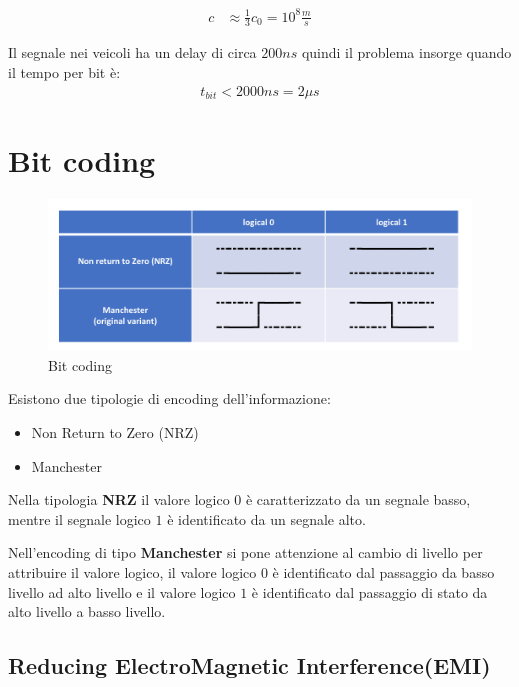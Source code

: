 \begin{align}
  c &\approx \frac{1}{3} c_0 = 10^8 \frac{m}{s}
  \label{eq:velocita_segale_bus}
\end{align}

Il segnale nei veicoli ha un delay di circa $200ns$ quindi il problema insorge quando il tempo per bit è:
\begin{align}
  t_{bit} < 2000ns = 2 \mu s
\end{align}


\section{Bit coding}
\begin{figure}[!ht]
  \begin{adjustbox}{width=0.5\columnwidth, center}
    \includegraphics{images/bit_coding.png}
  \end{adjustbox}
  \caption{Bit coding}
  \label{fig:bit_coding}
\end{figure}

Esistono due tipologie di encoding dell'informazione:
\begin{itemize}
  \item Non Return to Zero (NRZ)
  \item Manchester
\end{itemize}

Nella tipologia \textbf{NRZ} il valore logico $0$ è caratterizzato da un segnale basso, mentre il segnale logico $1$ è identificato da un segnale alto.

Nell'encoding di tipo \textbf{Manchester} si pone attenzione al cambio di livello per attribuire il valore logico, il valore logico $0$ è identificato dal passaggio da basso livello ad alto livello e il valore logico $1$ è identificato dal passaggio di stato da alto livello a basso livello.



\subsection{Reducing ElectroMagnetic Interference(EMI)}

